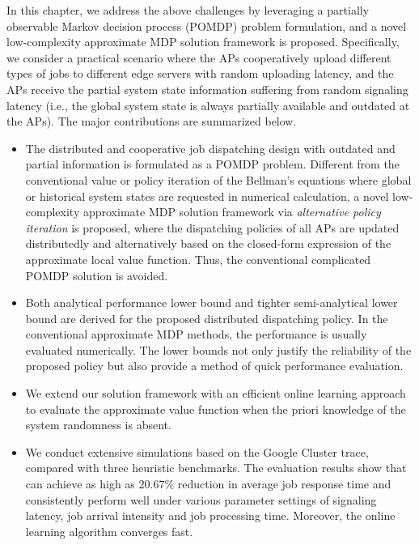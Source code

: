 In this chapter, we address the above challenges by leveraging a partially observable Markov decision process (POMDP) problem formulation, and a novel low-complexity approximate MDP solution framework is proposed.
Specifically, we consider a practical scenario where the APs cooperatively upload different types of jobs to different edge servers with random uploading latency, and the APs receive the partial system state information suffering from random signaling latency (i.e., the global system state is always partially available and outdated at the APs).
The major contributions are summarized below.
\begin{itemize}
    \item The distributed and cooperative job dispatching design with outdated and partial information is formulated as a POMDP problem.
    Different from the conventional value or policy iteration of the Bellman's equations where global or historical system states are requested in numerical calculation, a novel low-complexity approximate MDP solution framework via \emph{alternative policy iteration} is proposed, where the dispatching policies of all APs are updated distributedly and alternatively based on the {closed-form expression} of the approximate local value function.
    Thus, the conventional complicated POMDP solution is avoided.
    \item Both analytical performance lower bound and tighter semi-analytical lower bound are derived for the proposed distributed dispatching policy. In the conventional approximate MDP methods, the performance is usually evaluated numerically.
    The lower bounds not only justify the reliability of the proposed policy but also provide a method of quick performance evaluation.
    \item We extend our solution framework {\Dalgname} with an efficient online learning approach to evaluate the approximate value function when the priori knowledge of the system randomness is absent.
    \item We conduct extensive simulations based on the Google Cluster trace, compared with three heuristic benchmarks. The evaluation results show that {\Dalgname} can achieve as high as $20.67\%$ reduction in average job response time and consistently perform well under various parameter settings of signaling latency, job arrival intensity and job processing time. {Moreover, the online learning algorithm converges fast.}
\end{itemize}

